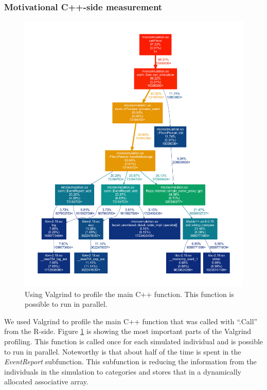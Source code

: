 \subsubsection{Motivational C++-side measurement}
\begin{figure}[!htbp] \centering
  \includegraphics[height=0.70\textheight]{images/simpleMotivatingValgrind.pdf}
  \caption{Using Valgrind to profile the main C++ function. This
    function is possible to run in parallel.}
  \label{fig:cppMot}
\end{figure}

We used Valgrind to profile the main C++ function that was called with
``.Call'' from the R-side. Figure \ref{fig:cppMot} is showing the most
important parts of the Valgrind profiling. This function is called
once for each simulated individual and is possible to run in
parallel. Noteworthy is that about half of the time is spent in the
\emph{EventReport} subfunction. This subfunction is reducing the
information from the individuals in the simulation to categories and
stores that in a dynamically allocated associative array.


